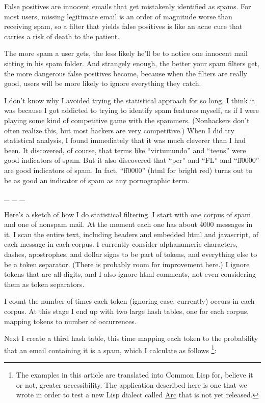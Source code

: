 False positives are innocent emails that get mistakenly identified as
spams. For most users, missing legitimate email is an order of magnitude
worse than receiving spam, so a filter that yields false positives is
like an acne cure that carries a risk of death to the patient.

The more spam a user gets, the less likely he'll be to notice one
innocent mail sitting in his spam folder. And strangely enough, the
better your spam filters get, the more dangerous false positives become,
because when the filters are really good, users will be more likely to
ignore everything they catch.

I don't know why I avoided trying the statistical approach for so long.
I think it was because I got addicted to trying to identify spam
features myself, as if I were playing some kind of competitive game with
the spammers. (Nonhackers don't often realize this, but most hackers are
very competitive.) When I did try statistical analysis, I found
immediately that it was much cleverer than I had been. It discovered, of
course, that terms like ``virtumundo'' and ``teens'' were good
indicators of spam. But it also discovered that ``per'' and ``FL'' and
``ff0000'' are good indicators of spam. In fact, ``ff0000'' (html for
bright red) turns out to be as good an indicator of spam as any
pornographic term.

\_ \_ \_

Here's a sketch of how I do statistical filtering. I start with one
corpus of spam and one of nonspam mail. At the moment each one has about
4000 messages in it. I scan the entire text, including headers and
embedded html and javascript, of each message in each corpus. I
currently consider alphanumeric characters, dashes, apostrophes, and
dollar signs to be part of tokens, and everything else to be a token
separator. (There is probably room for improvement here.) I ignore
tokens that are all digits, and I also ignore html comments, not even
considering them as token separators.

I count the number of times each token (ignoring case, currently) occurs
in each corpus. At this stage I end up with two large hash tables, one
for each corpus, mapping tokens to number of occurrences.

Next I create a third hash table, this time mapping each token to the
probability that an email containing it is a spam, which I calculate as
follows \footnote{The examples in this article are translated into Common Lisp
for, believe it or not, greater accessibility. The application described
here is one that we wrote in order to test a new Lisp dialect called
\href{arc.html}{Arc} that is not yet released.}:

